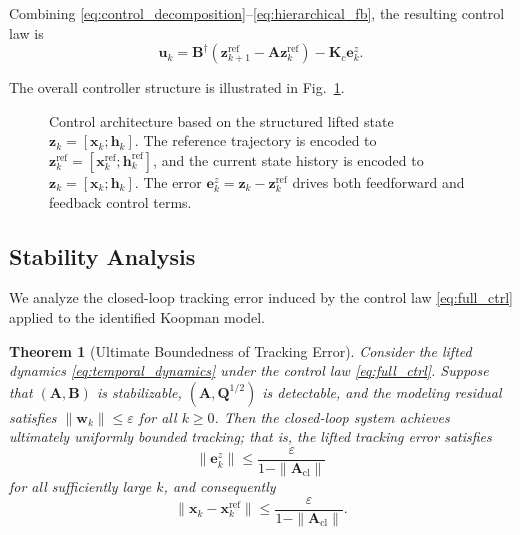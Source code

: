 \documentclass[journal]{IEEEtran}
\newtheorem{theorem}{Theorem}
\newcommand{\vx}{\mathbf{x}}
\newcommand{\vu}{\mathbf{u}}
\newcommand{\vz}{\mathbf{z}}
\newcommand{\vh}{\mathbf{h}}
\newcommand{\vw}{\mathbf{w}}
\newcommand{\ve}{\mathbf{e}}
\newcommand{\mA}{\mathbf{A}}
\newcommand{\mB}{\mathbf{B}}
\newcommand{\mQ}{\mathbf{Q}}
\newcommand{\mK}{\mathbf{K}}
\begin{document}
Combining \eqref{eq:control_decomposition}--\eqref{eq:hierarchical_fb}, the resulting control law is
\begin{equation}
    \vu_k
    =
    \mB^\dagger \!\left(\vz_{k+1}^{\mathrm{ref}} - \mA \vz_k^{\mathrm{ref}}\right)
    - \mK_c \ve_k^z.
    \label{eq:full_ctrl}
\end{equation}

The overall controller structure is illustrated in Fig.~\ref{fig:control_architecture}.

\begin{figure}[!t]
    \centering
    \caption{Control architecture based on the structured lifted state $\vz_k=[\vx_k;\vh_k]$. The reference trajectory is encoded to $\vz_k^{\mathrm{ref}}=[\vx_k^{\mathrm{ref}};\vh_k^{\mathrm{ref}}]$, and the current state history is encoded to $\vz_k=[\vx_k;\vh_k]$. The error $\ve_k^z = \vz_k - \vz_k^{\mathrm{ref}}$ drives both feedforward and feedback control terms.}
    \label{fig:control_architecture}
\end{figure}

\subsection{Stability Analysis}
\label{subsec:stability}

We analyze the closed-loop tracking error induced by the control law \eqref{eq:full_ctrl} applied to the identified Koopman model.

\begin{theorem}[Ultimate Boundedness of Tracking Error]
\label{thm:ub}
Consider the lifted dynamics \eqref{eq:temporal_dynamics} under the control law \eqref{eq:full_ctrl}. Suppose that $(\mA, \mB)$ is stabilizable, $(\mA, \mQ^{1/2})$ is detectable, and the modeling residual satisfies $\|\vw_k\| \leq \varepsilon$ for all $k \geq 0$. Then the closed-loop system achieves ultimately uniformly bounded tracking; that is, the lifted tracking error satisfies
\begin{equation}
    \|\ve_k^z\| \leq \frac{\varepsilon}{1 - \|\mA_{\mathrm{cl}}\|}
    \label{eq:ub_bound}
\end{equation}
for all sufficiently large $k$, and consequently
\begin{equation}
    \|\vx_k - \vx_k^{\mathrm{ref}}\| \leq \frac{\varepsilon}{1 - \|\mA_{\mathrm{cl}}\|}.
    \label{eq:phys_bound}
\end{equation}
\end{theorem}
\end{document}
